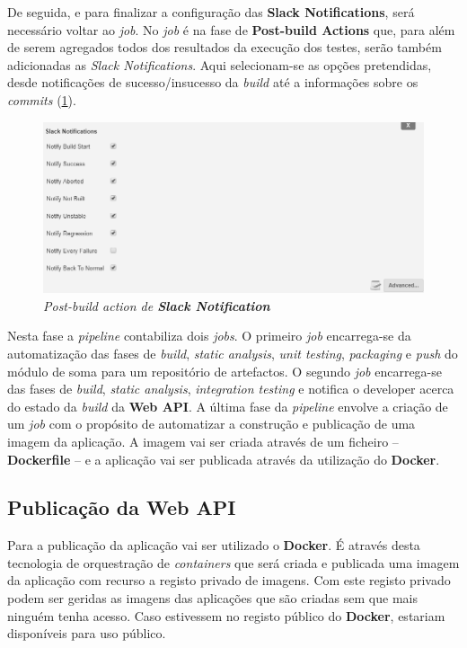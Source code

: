 \hspace{1cm}De seguida, e para finalizar a configuração das \textbf{Slack Notifications}, será necessário voltar ao \textit{job}. No \textit{job} é na fase de \textbf{Post-build Actions} que, para além de serem agregados todos dos resultados da execução dos testes, serão também adicionadas as \textit{Slack Notifications}. Aqui selecionam-se as opções pretendidas, desde notificações de sucesso/insucesso da \textit{build} até a informações sobre os \textit{commits} (\ref{Fig:Fig57}). 

\begin{figure}[hbt!]
\centering
\includegraphics[width=0.9\linewidth]{Cap5/JenkinsPostBuildSlackNotifications.png}
\caption{\textit{Post-build action de \textbf{Slack Notification}}}
\label{Fig:Fig57}
\end{figure}

\hspace{1cm}Nesta fase a \textit{pipeline} contabiliza dois \textit{jobs}. O primeiro \textit{job} encarrega-se da automatização das fases de \textit{build}, \textit{static analysis}, \textit{unit testing}, \textit{packaging} e \textit{push} do módulo de soma para um repositório de artefactos. O segundo \textit{job} encarrega-se das fases de \textit{build}, \textit{static analysis}, \textit{integration testing} e notifica o developer acerca do estado da \textit{build} da \textbf{Web API}. A última fase da \textit{pipeline} envolve a criação de um \textit{job} com o propósito de automatizar a construção e publicação de uma imagem da aplicação. A imagem vai ser criada através de um ficheiro -- \textbf{Dockerfile} -- e a aplicação vai ser publicada através da utilização do \textbf{Docker}.

\subsection{Publicação da Web API}

\hspace{1cm}Para a publicação da aplicação vai ser utilizado o \textbf{Docker}. É através desta tecnologia de orquestração de \textit{containers} que será criada e publicada uma imagem da aplicação com recurso a registo privado de imagens. Com este registo privado podem ser geridas as imagens das aplicações que são criadas sem que mais ninguém tenha acesso. Caso estivessem no registo público do \textbf{Docker}, estariam disponíveis para uso público.

